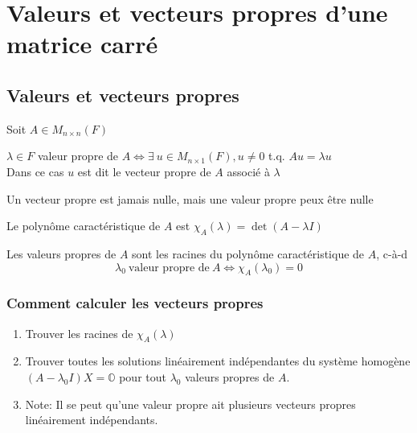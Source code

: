 \section{Valeurs et vecteurs propres d'une matrice carré}

\subsection{Valeurs et vecteurs propres}
Soit $A \in M_{n \times n}(F)$
\begin{definition}
    $\lambda \in F$ valeur propre de $A \iff \exists \ u \in M_{n \times 1}(F), u \neq 0$ t.q. $Au = \lambda u$ \\
    Dans ce cas $u$ est dit le vecteur propre de $A$ associé à $\lambda$
\end{definition}
\begin{remark}
    Un vecteur propre est jamais nulle, mais une valeur propre peux être nulle
\end{remark}
\begin{definition}
    Le polynôme caractéristique de $A$ est $\chi_A(\lambda) = \det(A - \lambda I)$
\end{definition}
\begin{theorem}
    Les valeurs propres de $A$ sont les racines du polynôme caractéristique de $A$, c-à-d
    \[
        \lambda_0 \ \text{valeur propre de} \ A \iff \chi_A(\lambda_0) = 0
    \]
\end{theorem}
\subsubsection{Comment calculer les vecteurs propres}
\begin{enumerate}
    \item Trouver les racines de $\chi_A(\lambda)$
    \item Trouver toutes les solutions linéairement indépendantes du système homogène $(A - \lambda_0 I)X = \mathbb{O}$
          pour tout $\lambda_0$ valeurs propres de $A$.
    \item[] Note: Il se peut qu'une valeur propre ait plusieurs vecteurs propres linéairement indépendants.
\end{enumerate}
